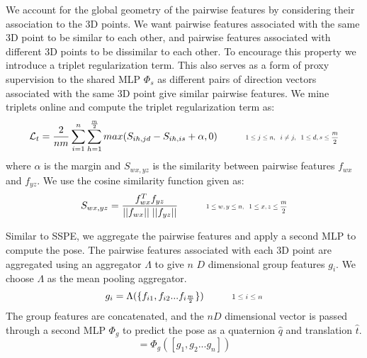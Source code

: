 \documentclass{article}
\newcommand{\Lagr}{\mathcal{L}}
\begin{document}
We account for the global geometry of the pairwise features by considering their association to the 3D points. We want pairwise features associated with the same 3D point to be similar to each other, and pairwise features associated with different 3D points to be dissimilar to each other. To encourage this property we introduce a triplet regularization term. This also serves as a form of proxy supervision to the shared MLP $\Phi_s$ as different pairs of direction vectors associated with the same 3D point give similar pairwise features. 
We mine triplets online and compute the triplet regularization term as:
\begin{equation}
\Lagr_t = \frac{2}{nm} \sum_{i=1}^{n} \sum_{h=1}^{\frac{m}{2}} max(S_{ih,jd} - S_{ih,is} + \alpha, 0) \hspace{1cm} \scaleto{1\leq j \leq n, \hspace{0.2cm} i\neq j, \hspace{0.2cm} 1 \leq d,s \leq \frac{m}{2}}{12pt}
\end{equation}
where $\alpha$ is the margin and $S_{wx,yz}$ is the similarity between pairwise features $f_{wx}$ and $f_{yz}$. We use the cosine similarity function given as:
\begin{equation}
S_{wx,yz} = \frac{f_{wx}^{T}f_{yz}}{||f_{wx}|| \hspace{0.1cm}||f_{yz}||} \hspace{1cm} \scaleto{1\leq w,y \leq n, \hspace{0.2cm} 1 \leq x,z \leq \frac{m}{2}}{12pt}
\end{equation}



Similar to SSPE, we aggregate the pairwise features and apply a second MLP to compute the pose. 
The pairwise features associated with each 3D point are aggregated using an aggregator $\Lambda$ to give $n$ $D$ dimensional group features $g_i$. We choose $\Lambda$ as the mean pooling aggregator. \begin{equation}
g_i = \Lambda(\{f_{i1}, f_{i2} ... f_{i\frac{m}{2}}\}) \hspace{1cm} \scaleto{1 \leq i \leq n}{6pt}
\end{equation}
The group features are concatenated, and the $nD$ dimensional vector is passed through a second MLP $\Phi_g$ to predict the pose as a quaternion $\hat{q}$ and translation $\hat{t}$. 
\begin{equation}
    [\hat{q},\hat{t}] = \Phi_g([g_1, g_2 ... g_n])
\end{equation}
\end{document}

